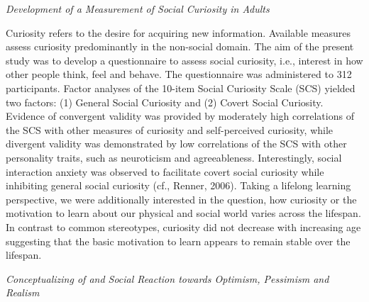 {\textit{Development of a Measurement of Social Curiosity in Adults}

 Curiosity refers to the desire for acquiring new information. Available measures assess curiosity predominantly in the non-social domain. The aim of the present study was to develop a questionnaire to assess social curiosity, i.e., interest in how other people think, feel and behave. The questionnaire was administered to 312 participants. Factor analyses of the 10-item Social Curiosity Scale (SCS) yielded two factors: (1) General Social Curiosity and (2) Covert Social Curiosity. Evidence of convergent validity was provided by moderately high correlations of the SCS with other measures of curiosity and self-perceived curiosity, while divergent validity was demonstrated by low correlations of the SCS with other personality traits, such as neuroticism and agreeableness. Interestingly, social interaction anxiety was observed to facilitate covert social curiosity while inhibiting general social curiosity (cf., Renner, 2006). Taking a lifelong learning perspective, we were additionally interested in the question, how curiosity or the motivation to learn about our physical and social world varies across the lifespan. In contrast to common stereotypes, curiosity did not decrease with increasing age suggesting that the basic motivation to learn appears to remain stable over the lifespan.

\textit{Conceptualizing of and Social Reaction towards Optimism, Pessimism and Realism}

}
